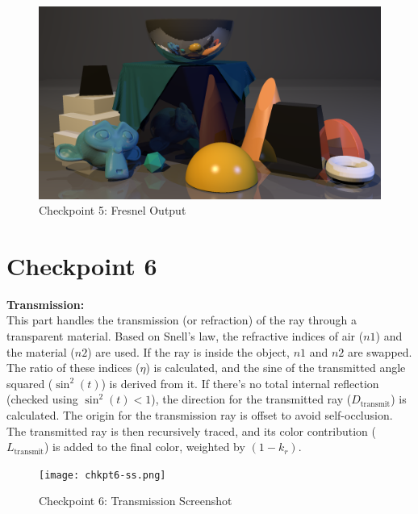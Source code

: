 \documentclass[a4paper]{report}
\begin{document}
\begin{figure}[H]
    \begin{adjustbox}{lap=-1.5cm}
        \includegraphics[width=1.2\textwidth]{chkpt5.png}
    \end{adjustbox}
    \caption{Checkpoint 5: Fresnel Output}
    \label{fig:chkpt5}
\end{figure}

\section*{Checkpoint 6}

\textbf{Transmission:} \\
This part handles the transmission (or refraction) of the ray through a transparent material. Based on Snell's law, the refractive indices of air ($n1$) and the material ($n2$) are used. 
If the ray is inside the object, $n1$ and $n2$ are swapped. 
The ratio of these indices ($\eta$) is calculated, and the sine of the transmitted angle squared ($\sin^2(t)$) is derived from it. 
If there's no total internal reflection (checked using $\sin^2(t) < 1$), the direction for the transmitted ray ($D_{\text{transmit}}$) is calculated. 
The origin for the transmission ray is offset to avoid self-occlusion. 
The transmitted ray is then recursively traced, and its color contribution ($L_{\text{transmit}}$) is added to the final color, weighted by $(1 - k_r)$.

\begin{figure}[H]
    \begin{adjustbox}{lap=-1.5cm}
        \texttt{[image: chkpt6-ss.png]}
    \end{adjustbox}
    \caption{Checkpoint 6: Transmission Screenshot}
    \label{fig:chkpt6-ss}
\end{figure}
\end{document}
